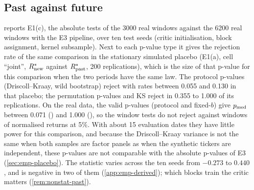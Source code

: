 \begin{table}[tbp]
  \centering
  \caption{Real-data placebo (E1(b)): rejection rates at $\alpha\in\{0.01,0.05,0.10\}$ when one
    random half of the 100 panel tickers is tested against the other half on the same dates; 50
    random splits within \TEST{} and 50 within \TRAIN{}; $L=20$. Relative tests (\TRAIN{} splits):
    $\Rnew$ = all real \TEST{} windows, $G$ = half B, $\Rpast$ = half A. Learned and relative
    tests use the time-block split; $^{\star}$marks the protocol's p-value (Driscoll--Kraay for
    learned tests, wild bootstrap for kernel tests). Fixed-$b$ rows: the Driscoll--Kraay
    statistic against fixed-$b$ references \citep{kiefer_2005_new}, conservative single-series
    reference (cons.) or two-sample equal-variance reference (eq.\ var.). Rates only: the splits
    are dependent and conditional on one realised market path, so binomial intervals do not
    apply.}
  \label{tab:e1-size-real}
  \small
\end{table}

\subsection{Past against future}\label{app:emp-nonstat}

 reports E1(c), the absolute tests of the 3000 real \TEST{} windows against
the 6200 real \TRAIN{} windows with the E3 pipeline, over ten test seeds (critic initialisation,
block assignment, kernel subsample). Next to each p-value type it gives the rejection rate of the
same comparison in the stationary simulated placebo (E1(a), cell ``joint'', $R_{\mathrm{new}}^*$ against
$R_{\mathrm{past}}^*$, 200 replications), which is the size of that p-value for this comparison when the
two periods have the same law. The protocol p-values (Driscoll--Kraay, wild bootstrap) reject
with rates between 0.055 and 0.130 in that placebo; the permutation p-values and KS reject in 0.355 to 1.000 of its replications. On
the real data, the valid p-values (protocol and fixed-$b$) give $p_{\mathrm{med}}$ between 0.071 (\LRC{}) and
1.000 (\SigMMD{}), so the window tests do not reject \TRAIN{} against \TEST{} windows of
normalised returns at 5\%. With about 15 \TEST{} evaluation dates they have little power for this
comparison, and because the Driscoll--Kraay variance is not the same when both samples are factor
panels as when the synthetic tickers are independent, these p-values are not comparable with the
absolute p-values of E3 (\cref{sec:emp-placebo}). The \WC{}
statistic varies across the ten seeds from $-0.273$ to $0.440$, and is negative in two of them
(\cref{app:emp-derived}); which \TRAIN{} blocks train the critic matters
(\cref{rem:nonstat-past}).

